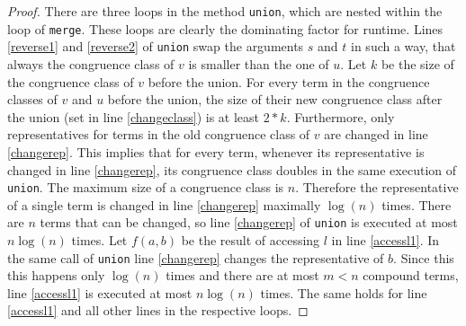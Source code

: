 \begin{proof}

There are three loops in the method \texttt{union}, which are nested within the loop of \texttt{merge}.
These loops are clearly the dominating factor for runtime.
Lines \ref{reverse1} and \ref{reverse2} of \texttt{union} swap the arguments $s$ and $t$ in such a way, that always the congruence class of $v$ is smaller than the one of $u$.
Let $k$ be the size of the congruence class of $v$ before the union.
For every term in the congruence classes of $v$ and $u$ before the union, the size of their new congruence class after the union (set in line \ref{changeclass}) is at least $2*k$.
Furthermore, only representatives for terms in the old congruence class of $v$ are changed in line \ref{changerep}.
This implies that for every term, whenever its representative is changed in line \ref{changerep}, its congruence class doubles in the same execution of \texttt{union}.
The maximum size of a congruence class is $n$.
Therefore the representative of a single term is changed in line \ref{changerep} maximally $\log(n)$ times.
There are $n$ terms that can be changed, so line \ref{changerep} of \texttt{union} is executed at most $n \log(n)$ times.
Let $f(a,b)$ be the result of accessing $l$ in line \ref{accessl1}.
In the same call of \texttt{union} line \ref{changerep} changes the representative of $b$.
Since this this happens only $\log(n)$ times and there are at most $m < n$ compound terms, line \ref{accessl1} is executed at most $n \log(n)$ times.
The same holds for line \ref{accessl1} and all other lines in the respective loops.

\end{proof}


\FloatBarrier

